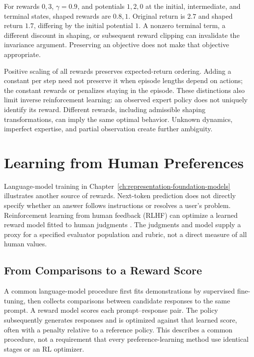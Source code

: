 For rewards $0,3$, $\gamma=0.9$, and potentials $1,2,0$ at the initial, intermediate, and terminal states, shaped rewards are $0.8,1$. Original return is $2.7$ and shaped return $1.7$, differing by the initial potential $1$. A nonzero terminal term, a different discount in shaping, or subsequent reward clipping can invalidate the invariance argument. Preserving an objective does not make that objective appropriate.

Positive scaling of all rewards preserves expected-return ordering. Adding a constant per step need not preserve it when episode lengths depend on actions; the constant rewards or penalizes staying in the episode. These distinctions also limit inverse reinforcement learning: an observed expert policy does not uniquely identify its reward. Different rewards, including admissible shaping transformations, can imply the same optimal behavior. Unknown dynamics, imperfect expertise, and partial observation create further ambiguity.

\section{Learning from Human Preferences}

Language-model training in Chapter~\ref{ch:representation-foundation-models} illustrates another source of rewards. Next-token prediction does not directly specify whether an answer follows instructions or resolves a user's problem. Reinforcement learning from human feedback (RLHF) can optimize a learned reward model fitted to human judgments \citep{christiano2017,ouyang2022}. The judgments and model supply a proxy for a specified evaluator population and rubric, not a direct measure of all human values.

\subsection{From Comparisons to a Reward Score}

A common language-model procedure first fits demonstrations by supervised fine-tuning, then collects comparisons between candidate responses to the same prompt. A reward model scores each prompt--response pair. The policy subsequently generates responses and is optimized against that learned score, often with a penalty relative to a reference policy. This describes a common procedure, not a requirement that every preference-learning method use identical stages or an RL optimizer.

